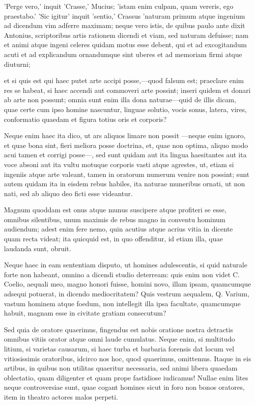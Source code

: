  'Perge vero,' inquit 'Crasse,' Mucius; 'istam enim culpam, quam vereris, ego praestabo.' 'Sic igitur' inquit 'sentio,' Crassus 'naturam primum atque ingenium ad dicendum vim adferre maximam; neque vero istis, de quibus paulo ante dixit Antonius, scriptoribus artis rationem dicendi et viam, sed naturam defuisse; nam et animi atque ingeni celeres quidam motus esse debent, qui et ad excogitandum acuti et ad explicandum ornandumque sint uberes et ad memoriam firmi atque diuturni;

 et si quis est qui haec putet arte accipi posse,—quod falsum est; praeclare enim res se habeat, si haec accendi aut commoveri arte possint; inseri quidem et donari ab arte non possunt; omnia sunt enim illa dona naturae—quid de illis dicam, quae certe cum ipso homine nascuntur, linguae solutio, vocis sonus, latera, vires, conformatio quaedam et figura totius oris et corporis?

 Neque enim haec ita dico, ut ars aliquos limare non possit —neque enim ignoro, et quae bona sint, fieri meliora posse doctrina, et, quae non optima, aliquo modo acui tamen et corrigi posse—, sed sunt quidam aut ita lingua haesitantes aut ita voce absoni aut ita vultu motuque corporis vasti atque agrestes, ut, etiam si ingeniis atque arte valeant, tamen in oratorum numerum venire non possint; sunt autem quidam ita in eisdem rebus habiles, ita naturae muneribus ornati, ut non nati, sed ab aliquo deo ficti esse videantur.

 Magnum quoddam est onus atque munus suscipere atque profiteri se esse, omnibus silentibus, unum maximis de rebus magno in conventu hominum audiendum; adest enim fere nemo, quin acutius atque acrius vitia in dicente quam recta videat; ita quicquid est, in quo offenditur, id etiam illa, quae laudanda sunt, obruit.

 Neque haec in eam sententiam disputo, ut homines adulescentis, si quid naturale forte non habeant, omnino a dicendi studio deterream: quis enim non videt C. Coelio, aequali meo, magno honori fuisse, homini novo, illam ipsam, quamcumque adsequi potuerat, in dicendo mediocritatem? Quis vestrum aequalem, Q. Varium, vastum hominem atque foedum, non intellegit illa ipsa facultate, quamcumque habuit, magnam esse in civitate gratiam consecutum?

 Sed quia de oratore quaerimus, fingendus est nobis oratione nostra detractis omnibus vitiis orator atque omni laude cumulatus. Neque enim, si multitudo litium, si varietas causarum, si haec turba et barbaria forensis dat locum vel vitiosissimis oratoribus, idcirco nos hoc, quod quaerimus, omittemus. Itaque in eis artibus, in quibus non utilitas quaeritur necessaria, sed animi libera quaedam oblectatio, quam diligenter et quam prope fastidiose iudicamus! Nullae enim lites neque controversiae sunt, quae cogant homines sicut in foro non bonos oratores, item in theatro actores malos perpeti.

